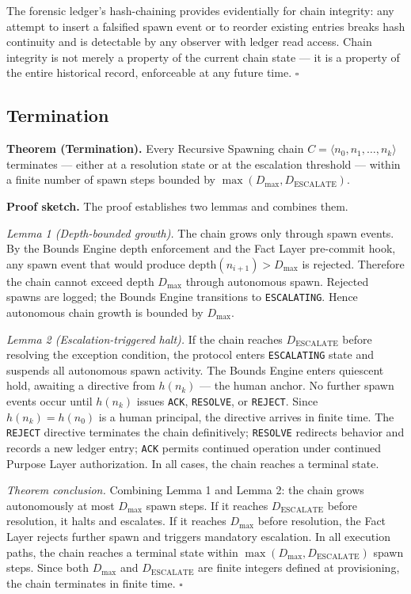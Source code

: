 \medskip
The forensic ledger's hash-chaining provides evidentially for chain integrity: any attempt to insert a falsified spawn event or to reorder existing entries breaks hash continuity and is detectable by any observer with ledger read access. Chain integrity is not merely a property of the current chain state — it is a property of the entire historical record, enforceable at any future time. $\square$

\subsection{Termination}
\label{sec:rs-termination}

\medskip
\noindent\textbf{Theorem (Termination).} Every Recursive Spawning chain $C = \langle n_0, n_1, \ldots, n_k \rangle$ terminates — either at a resolution state or at the escalation threshold — within a finite number of spawn steps bounded by $\max(D_{\mathrm{max}}, D_{\mathrm{ESCALATE}})$.

\medskip
\noindent\textbf{Proof sketch.} The proof establishes two lemmas and combines them.

\medskip
\textit{Lemma 1 (Depth-bounded growth).} The chain grows only through spawn events. By the Bounds Engine depth enforcement and the Fact Layer pre-commit hook, any spawn event that would produce $\mathrm{depth}(n_{i+1}) > D_{\mathrm{max}}$ is rejected. Therefore the chain cannot exceed depth $D_{\mathrm{max}}$ through autonomous spawn. Rejected spawns are logged; the Bounds Engine transitions to \texttt{ESCALATING}. Hence autonomous chain growth is bounded by $D_{\mathrm{max}}$.

\medskip
\textit{Lemma 2 (Escalation-triggered halt).} If the chain reaches $D_{\mathrm{ESCALATE}}$ before resolving the exception condition, the protocol enters \texttt{ESCALATING} state and suspends all autonomous spawn activity. The Bounds Engine enters quiescent hold, awaiting a directive from $h(n_k)$ — the human anchor. No further spawn events occur until $h(n_k)$ issues \texttt{ACK}, \texttt{RESOLVE}, or \texttt{REJECT}. Since $h(n_k) = h(n_0)$ is a human principal, the directive arrives in finite time. The \texttt{REJECT} directive terminates the chain definitively; \texttt{RESOLVE} redirects behavior and records a new ledger entry; \texttt{ACK} permits continued operation under continued Purpose Layer authorization. In all cases, the chain reaches a terminal state.

\medskip
\textit{Theorem conclusion.} Combining Lemma 1 and Lemma 2: the chain grows autonomously at most $D_{\mathrm{max}}$ spawn steps. If it reaches $D_{\mathrm{ESCALATE}}$ before resolution, it halts and escalates. If it reaches $D_{\mathrm{max}}$ before resolution, the Fact Layer rejects further spawn and triggers mandatory escalation. In all execution paths, the chain reaches a terminal state within $\max(D_{\mathrm{max}}, D_{\mathrm{ESCALATE}})$ spawn steps. Since both $D_{\mathrm{max}}$ and $D_{\mathrm{ESCALATE}}$ are finite integers defined at provisioning, the chain terminates in finite time. $\square$

